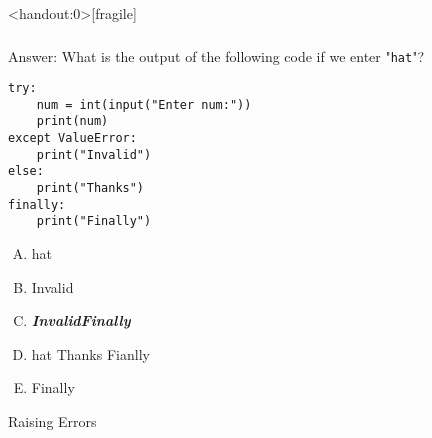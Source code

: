 \documentclass[xcolor=svgnames]{beamer}
\newenvironment{FVerbatim}
 {\VerbatimEnvironment
  \begin{center}
  \begin{lrbox}{\FVerbBox}
  \begin{BVerbatim}}
 {\end{BVerbatim}
  \end{lrbox}
  \fbox{\usebox{\FVerbBox}}
  \end{center}}
\newcommand{\nl}{\\[1em]}
\newcommand{\answer}[1]{\textit{\textbf{\textcolor{iyellow}{#1}}}}
\newcommand{\ft}[1]{\frametitle{#1}}
\begin{document}

\begin{frame}<handout:0>[fragile]\ft{}
  \begin{block}{Answer:}
  What is the output of the following code if we enter "{\tt hat}"?
\begin{Verbatim}
try:
	num = int(input("Enter num:"))
	print(num)
except ValueError:
    print("Invalid")
else:
    print("Thanks")
finally:
    print("Finally")
\end{Verbatim}
\begin{multicols}{5}
\begin{enumerate}[A)]
\item hat \newline\newline
\item Invalid\newline  \newline
\item \answer{Invalid}\newline \answer{Finally} \newline
\item hat \newline Thanks \newline Fianlly
\item Finally \newline  \newline 
\end{enumerate}
\end{multicols}
  \end{block} 
\end{frame}



\begin{frame}[fragile]{Raising Errors}
\end{frame}
\end{document}
